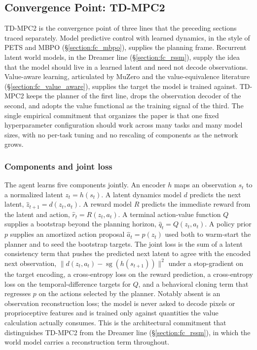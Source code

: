 \subsection{Convergence Point: TD-MPC2}
\label{section:fc_tdmpc2}

TD-MPC2 \citep{Hansen2024TDMPC2} is the convergence point of three lines that the preceding sections traced separately. Model predictive control with learned dynamics, in the style of PETS and MBPO (\S\ref{section:fc_mbpo}), supplies the planning frame. Recurrent latent world models, in the Dreamer line (\S\ref{section:fc_rssm}), supply the idea that the model should live in a learned latent and need not decode observations. Value-aware learning, articulated by MuZero and the value-equivalence literature (\S\ref{section:fc_value_aware}), supplies the target the model is trained against. TD-MPC2 keeps the planner of the first line, drops the observation decoder of the second, and adopts the value functional as the training signal of the third. The single empirical commitment that organizes the paper is that one fixed hyperparameter configuration should work across many tasks and many model sizes, with no per-task tuning and no rescaling of components as the network grows.

\subsubsection{Components and joint loss}
\label{section:fc_tdmpc2_components}

The agent learns five components jointly. An encoder $h$ maps an observation $s_t$ to a normalized latent $z_t = h(s_t)$. A latent dynamics model $d$ predicts the next latent, $\hat z_{t+1} = d(z_t, a_t)$. A reward model $R$ predicts the immediate reward from the latent and action, $\hat r_t = R(z_t, a_t)$. A terminal action-value function $Q$ supplies a bootstrap beyond the planning horizon, $\hat q_t = Q(z_t, a_t)$. A policy prior $p$ supplies an amortized action proposal $\hat a_t = p(z_t)$ used both to warm-start the planner and to seed the bootstrap targets. The joint loss is the sum of a latent consistency term that pushes the predicted next latent to agree with the encoded next observation, $\| d(z_t, a_t) - \operatorname{sg}(h(s_{t+1})) \|^2$ under a stop-gradient on the target encoding, a cross-entropy loss on the reward prediction, a cross-entropy loss on the temporal-difference targets for $Q$, and a behavioral cloning term that regresses $p$ on the actions selected by the planner. Notably absent is an observation reconstruction loss; the model is never asked to decode pixels or proprioceptive features and is trained only against quantities the value calculation actually consumes. This is the architectural commitment that distinguishes TD-MPC2 from the Dreamer line (\S\ref{section:fc_rssm}), in which the world model carries a reconstruction term throughout.

